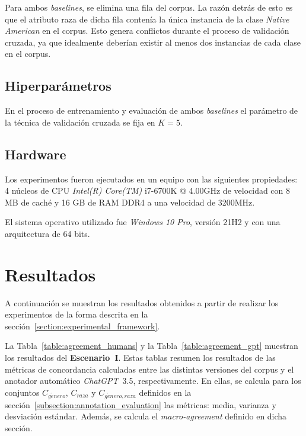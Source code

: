 Para ambos \emph{baselines}, se elimina una fila del corpus. La raz\'on detr\'as de esto es que el atributo raza de dicha 
fila conten\'ia la \'unica instancia de la clase \emph{Native American} en el corpus. 
Esto genera conflictos durante el proceso de validaci\'on cruzada, ya que idealmente deber\'ian existir al menos dos 
instancias de cada clase en el corpus.

\subsection{Hiperpar\'ametros}
En el proceso de entrenamiento y evaluaci\'on de ambos \emph{baselines} el par\'ametro de la t\'ecnica de validaci\'on
cruzada se fija en $K=5$. 


\subsection{Hardware}
Los experimentos fueron ejecutados en un equipo con las siguientes propiedades: 4 n\'ucleos de CPU \emph{Intel(R) Core(TM)} i7-6700K
@ 4.00GHz de velocidad con 8 MB de cach\'e y 16 GB de RAM DDR4 a una velocidad de 3200MHz.

El sistema operativo utilizado fue \emph{Windows 10 Pro}, versi\'on 21H2 y con una arquitectura de 64 bits.

\section{Resultados}\label{section:results}
A continuaci\'on se muestran los resultados obtenidos a partir de realizar los experimentos de la forma descrita en la 
secci\'on~\ref{section:experimental_framework}.

La Tabla~\ref{table:agreement_humans} y la Tabla~\ref{table:agreement_gpt} muestran los resultados del \textbf{Escenario~I}.
Estas tablas resumen los resultados de las m\'etricas de concordancia calculadas entre las distintas
versiones del corpus y el anotador autom\'atico \emph{ChatGPT}~3.5, respectivamente. En ellas, se 
calcula para los conjuntos $C_{g\acute{e}nero}$, $C_{raza}$ y $C_{g\acute{e}nero, raza}$ definidos
en la secci\'on~\ref{subsection:annotation_evaluation} las m\'etricas: media, varianza y desviaci\'on
est\'andar. Adem\'as, se calcula el \emph{macro-agreement} definido en dicha secci\'on.

